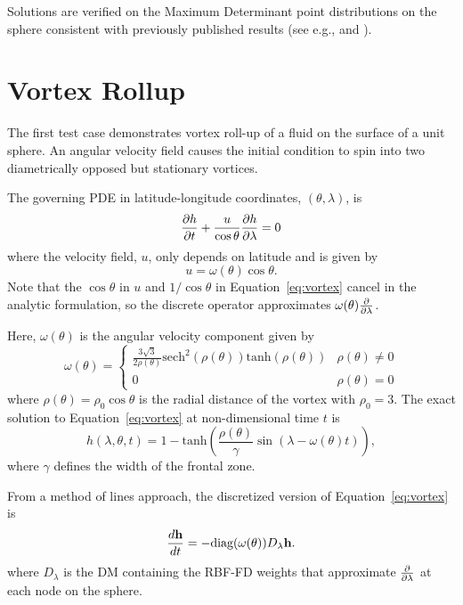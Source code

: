 \documentclass{report}
\begin{document}
Solutions are verified on the Maximum Determinant point distributions on the sphere \cite{Sloan2003} consistent with previously published results (see e.g., \cite{Flyer2007} and \cite{Fornberg2011b}).

\section{Vortex Rollup}
\label{sec:numerical_validation}
The first test case demonstrates vortex roll-up of a fluid on the surface of a unit sphere. An angular velocity field causes the initial condition to spin into two diametrically opposed but stationary vortices.

The governing PDE in latitude-longitude coordinates, $(\theta,\lambda)$, is
\begin{equation}
\frac{\partial h}{\partial t} + \frac{u}{\cos \theta} \frac{\partial h}{\partial \lambda} = 0
\label{eq:vortex}
\end{equation}
where the velocity field, $u$, only depends on latitude and is given by
\begin{equation*}
u  = \omega(\theta) \cos \theta.
\end{equation*}
Note that the $\cos \theta$ in $u$ and $1/\cos{\theta}$ in Equation~\ref{eq:vortex} cancel in the analytic formulation, so the discrete operator approximates $\omega(\theta) \frac{\partial }{\partial \lambda}$. 

Here, $\omega(\theta)$ is the angular velocity component given by
\begin{equation*}
\omega(\theta) =
\begin{cases}
\frac{3\sqrt{3}}{2 \rho(\theta)} \mathrm{sech}^{2}(\rho(\theta)) \mathrm{tanh}(\rho(\theta)) & \rho(\theta) \neq 0 \\
0 & \rho(\theta) = 0
\end{cases}
\end{equation*}
where $\rho(\theta) = \rho_0 \cos \theta$ is the radial distance of the vortex with $\rho_0=3$. The exact solution to Equation~\ref{eq:vortex} at non-dimensional time $t$ is
\begin{equation*}
h(\lambda, \theta, t) = 1 - \mathrm{tanh}\left( \frac{\rho(\theta)}{\gamma} \sin(\lambda - \omega(\theta) t) \right),
\end{equation*}
where $\gamma$ defines the width of the frontal zone.

From a method of lines approach, the discretized version of Equation~\ref{eq:vortex} is
\begin{equation}
\frac{d \mathbf{h}}{d t} = - \text{diag}(\omega(\theta)) D_\lambda \mathbf{h}.
\label{eq:vortex_matrix_form}
\end{equation}
where $D_\lambda$ is the DM containing the RBF-FD weights that approximate $\frac{\partial }{\partial \lambda}$ at each node on the sphere.
\end{document}
